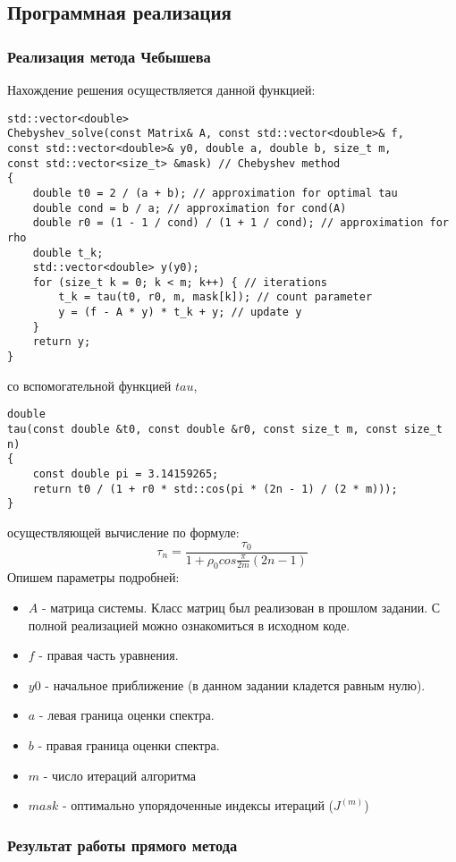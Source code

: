 \documentclass[a4paper,12pt,titlepage,final]{article}
\begin{document}
\subsection{Программная реализация}
\subsubsection{Реализация метода Чебышева}
Нахождение решения осуществляется данной функцией: 
\begin{verbatim}
std::vector<double>
Chebyshev_solve(const Matrix& A, const std::vector<double>& f,
const std::vector<double>& y0, double a, double b, size_t m, 
const std::vector<size_t> &mask) // Chebyshev method
{
    double t0 = 2 / (a + b); // approximation for optimal tau
    double cond = b / a; // approximation for cond(A)
    double r0 = (1 - 1 / cond) / (1 + 1 / cond); // approximation for rho 
    double t_k;
    std::vector<double> y(y0);
    for (size_t k = 0; k < m; k++) { // iterations
        t_k = tau(t0, r0, m, mask[k]); // count parameter
        y = (f - A * y) * t_k + y; // update y
    }
    return y;
}
\end{verbatim}
со вспомогательной функцией $tau$,
\begin{verbatim}
double
tau(const double &t0, const double &r0, const size_t m, const size_t n)
{
    const double pi = 3.14159265;
    return t0 / (1 + r0 * std::cos(pi * (2n - 1) / (2 * m)));
}
\end{verbatim}
осуществляющей вычисление по формуле:
$$\tau_n = \frac{\tau_0}{1 + \rho_0cos\frac{\pi}{2m}(2n-1)}$$
Опишем параметры подробней:
\begin{itemize}
    \item $A$ - матрица системы. Класс матриц был реализован в прошлом задании. С полной реализацией можно ознакомиться в исходном коде.
    \item $f$ - правая часть уравнения.
    \item $y0$ - начальное приближение (в данном задании кладется равным нулю).
    \item $a$ - левая граница оценки спектра.
    \item $b$ - правая граница оценки спектра.
    \item $m$ - число итераций алгоритма
    \item $mask$ - оптимально упорядоченные индексы итераций ($J^{(m)}$)
\end{itemize}
\subsubsection{Результат работы прямого метода}
\end{document}
